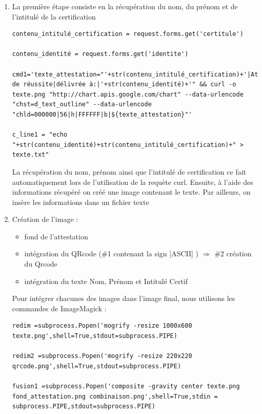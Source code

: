 \documentclass[12pt]{article}
\newcommand{\1}{\mathbbm{1}}
\begin{document}
\begin{enumerate}[label=(\arabic*)]

\item La première étape consiste en la récupération du nom, du prénom et de l'intitulé de la certification

\begin{lstlisting}
contenu_intitulé_certification = request.forms.get('certitule')

contenu_identité = request.forms.get('identite')	

cmd1='texte_attestation="'+str(contenu_intitulé_certification)+'|Attestation de réussite|délivrée à:|'+str(contenu_identité)+'" && curl -o texte.png "http://chart.apis.google.com/chart" --data-urlencode "chst=d_text_outline" --data-urlencode "chld=000000|56|h|FFFFFF|b|${texte_attestation}"'

c_line1 = "echo "+str(contenu_identité)+str(contenu_intitulé_certification)+" > texte.txt"
\end{lstlisting}
\vspace*{7mm}
La récupération du nom, prénom ainsi que l'intitulé de certification ce fait automatiquement lors de l'utilisation de la requète curl. Ensuite, à l'aide des informations récupéré on créé une image contenant le texte. Par ailleurs, on insère les informations dans un fichier texte

\item Création de l'image : 

\begin{itemize}
		\item fond de l'attestation 
		\item intégration du QRcode ($\#$1 contenant la sign [ASCII] ) $\Rightarrow$ $\#$2 création du Qrcode 	
		\item intégration du texte Nom, Prénom et Intitulé Certif
\end{itemize}	

Pour intégrer chacunes des images dans l'image final, nous utilisons les commandes de ImageMagick : 

\begin{lstlisting}
redim =subprocess.Popen('mogrify -resize 1000x600 texte.png',shell=True,stdout=subprocess.PIPE)
	
redim2 =subprocess.Popen('mogrify -resize 220x220 qrcode.png',shell=True,stdout=subprocess.PIPE)
	
fusion1 =subprocess.Popen('composite -gravity center texte.png fond_attestation.png combinaison.png',shell=True,stdin = subprocess.PIPE,stdout=subprocess.PIPE)
	

\end{lstlisting}
\end{enumerate}
\end{document}
